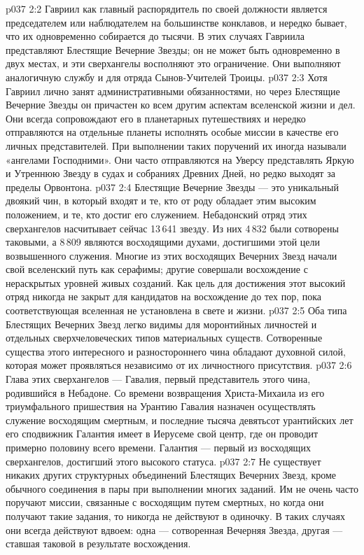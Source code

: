 \vs p037 2:2 Гавриил как главный распорядитель по своей должности является председателем или наблюдателем на большинстве конклавов, и нередко бывает, что их одновременно собирается до тысячи. В этих случаях Гавриила представляют Блестящие Вечерние Звезды; он не может быть одновременно в двух местах, и эти сверхангелы восполняют это ограничение. Они выполняют аналогичную службу и для отряда Сынов\hyp{}Учителей Троицы.
\vs p037 2:3 Хотя Гавриил лично занят административными обязанностями, но через Блестящие Вечерние Звезды он причастен ко всем другим аспектам вселенской жизни и дел. Они всегда сопровождают его в планетарных путешествиях и нередко отправляются на отдельные планеты исполнять особые миссии в качестве его личных представителей. При выполнении таких поручений их иногда называли «ангелами Господними». Они часто отправляются на Уверсу представлять Яркую и Утреннюю Звезду в судах и собраниях Древних Дней, но редко выходят за пределы Орвонтона.
\vs p037 2:4 \pc Блестящие Вечерние Звезды --- это уникальный двоякий чин, в который входят и те, кто от роду обладает этим высоким положением, и те, кто достиг его служением. Небадонский отряд этих сверхангелов насчитывает сейчас 13\,641 звезду. Из них 4\,832 были сотворены таковыми, а 8\,809 являются восходящими духами, достигшими этой цели возвышенного служения. Многие из этих восходящих Вечерних Звезд начали свой вселенский путь как серафимы; другие совершали восхождение с нераскрытых уровней живых созданий. Как цель для достижения этот высокий отряд никогда не закрыт для кандидатов на восхождение до тех пор, пока соответствующая вселенная не установлена в свете и жизни.
\vs p037 2:5 Оба типа Блестящих Вечерних Звезд легко видимы для моронтийных личностей и отдельных сверхчеловеческих типов материальных существ. Сотворенные существа этого интересного и разностороннего чина обладают духовной силой, которая может проявляться независимо от их личностного присутствия.
\vs p037 2:6 \pc Глава этих сверхангелов --- Гавалия, первый представитель этого чина, родившийся в Небадоне. Со времени возвращения Христа\hyp{}Михаила из его триумфального пришествия на Урантию Гавалия назначен осуществлять служение восходящим смертным, и последние тысяча девятьсот урантийских лет его сподвижник Галантия имеет в Иерусеме свой центр, где он проводит примерно половину всего времени. Галантия --- первый из восходящих сверхангелов, достигший этого высокого статуса.
\vs p037 2:7 Не существует никаких других структурных объединений Блестящих Вечерних Звезд, кроме обычного соединения в пары при выполнении многих заданий. Им не очень часто поручают миссии, связанные с восходящим путем смертных, но когда они получают такие задания, то никогда не действуют в одиночку. В таких случаях они всегда действуют вдвоем: одна --- сотворенная Вечерняя Звезда, другая --- ставшая таковой в результате восхождения.

